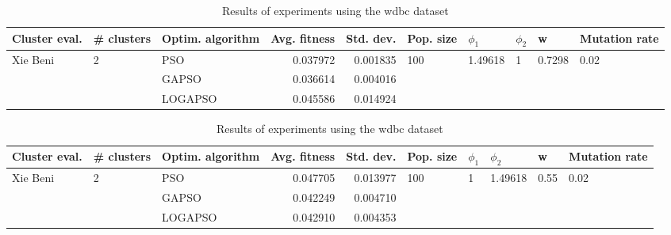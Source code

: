 \documentclass{article}
\begin{document}
\begin{table}
\centering
\caption{Results of experiments using the wdbc dataset}
\begin{tabular}{lllrrlllll}
\toprule
            Cluster eval. &        \# clusters & Optim. algorithm &  Avg. fitness &  Std. dev. &            Pop. size &               $\phi_{1}$ &         $\phi_{2}$ &                       w &         Mutation rate \\
\midrule
\multirow{3}{*}{Xie Beni} & \multirow{3}{*}{2} &              PSO &      0.037972 &   0.001835 & \multirow{3}{*}{100} & \multirow{3}{*}{1.49618} & \multirow{3}{*}{1} & \multirow{3}{*}{0.7298} & \multirow{3}{*}{0.02} \\
                          &                    &            GAPSO &      0.036614 &   0.004016 &                      &                          &                    &                         &                       \\
                          &                    &          LOGAPSO &      0.045586 &   0.014924 &                      &                          &                    &                         &                       \\
\bottomrule
\end{tabular}
\end{table}
\begin{table}
\centering
\caption{Results of experiments using the wdbc dataset}
\begin{tabular}{lllrrlllll}
\toprule
            Cluster eval. &        \# clusters & Optim. algorithm &  Avg. fitness &  Std. dev. &            Pop. size &         $\phi_{1}$ &               $\phi_{2}$ &                     w &         Mutation rate \\
\midrule
\multirow{3}{*}{Xie Beni} & \multirow{3}{*}{2} &              PSO &      0.047705 &   0.013977 & \multirow{3}{*}{100} & \multirow{3}{*}{1} & \multirow{3}{*}{1.49618} & \multirow{3}{*}{0.55} & \multirow{3}{*}{0.02} \\
                          &                    &            GAPSO &      0.042249 &   0.004710 &                      &                    &                          &                       &                       \\
                          &                    &          LOGAPSO &      0.042910 &   0.004353 &                      &                    &                          &                       &                       \\
\bottomrule
\end{tabular}
\end{table}
\end{document}
